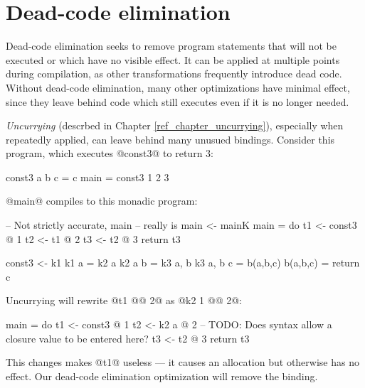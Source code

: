 \documentclass[12pt]{report}
\begin{document}


\chapter{Dead-code elimination}

Dead-code elimination seeks to remove program statements that will not
be executed or which have no visible effect. It can be applied at multiple
points during compilation, as other transformations frequently introduce 
dead code. Without dead-code elimination, many other optimizations have
minimal effect, since they leave behind code which still executes even if
it is no longer needed.

\emph{Uncurrying} (descrbed in Chapter \ref{ref_chapter_uncurrying}), especially
when repeatedly applied, can leave behind many unusued bindings. Consider
this program, which executes @const3@ to return 3:

\begin{code}
const3 a b c = c
main = const3 1 2 3
\end{code}

@main@ compiles to this monadic program:

\begin{code}
-- Not strictly accurate, main
-- really is main <- mainK {}
main = do
 t1 <- const3 @ 1
 t2 <- t1 @ 2
 t3 <- t2 @ 3
 return t3

const3 <- k1 {}
k1 {} a = k2 {a} 
k2 {a} b = k3 {a, b}
k3 {a, b} c = b(a,b,c)
b(a,b,c) = return c
\end{code}

Uncurrying will rewrite @t1 @@ 2@ as @k2 {1} @@ 2@:

\begin{code}
main = do
 t1 <- const3 @ 1
 t2 <- k2 {a} @ 2 -- TODO: Does syntax allow a closure value to be entered here?
 t3 <- t2 @ 3
 return t3
\end{code}

This changes makes @t1@ useless --- it causes an allocation but otherwise 
has no effect. Our dead-code elimination optimization will remove the binding.

\end{document}
